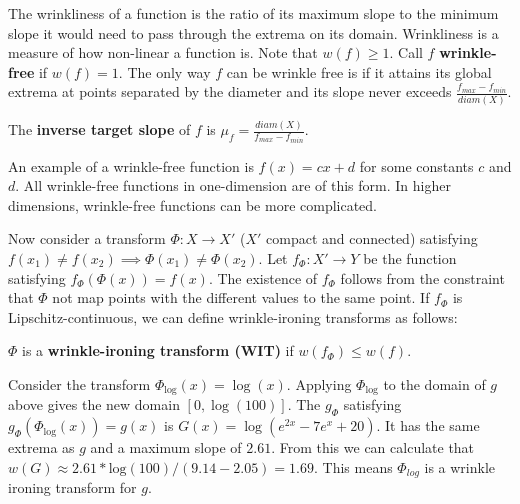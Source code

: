 The wrinkliness of a function is the ratio of its maximum slope to the
minimum slope it would need to pass through the extrema on its domain.
Wrinkliness is a measure of how non-linear a function is.
Note that $w(f) \geq 1$. Call $f$ \textbf{wrinkle-free} if $w(f) = 1$. 
The only way $f$ can be wrinkle free is if it attains its global extrema
at points separated by the diameter and its slope never exceeds
$\frac{f_{max} - f_{min}}{diam(X)}$.

\begin{definition}
The \textbf{inverse target slope} of $f$ is
$\mu_f = \frac{diam(X)}{f_{max} - f_{min}}$.
\end{definition}

An example of a wrinkle-free function is $f(x) = c x + d$ for some
constants $c$ and $d$. All wrinkle-free functions in one-dimension are of
this form. In higher dimensions, wrinkle-free functions can be more
complicated.

Now consider a transform $\Phi: X \to X'$ ($X'$ compact and connected)
satisfying $f(x_1) \neq f(x_2) \implies \Phi(x_1) \neq \Phi(x_2)$.
Let $f_\Phi : X' \to Y$ be the function satisfying $f_\Phi(\Phi(x)) = f(x)$.
The existence of $f_\Phi$ follows from the constraint that $\Phi$ not map
points with the different values to the same point.
If $f_\Phi$ is Lipschitz-continuous, we can define wrinkle-ironing transforms
as follows:

\begin{definition}
$\Phi$ is a \textbf{wrinkle-ironing transform (WIT)} if $w(f_\Phi) \leq w(f)$.
\end{definition}

Consider the transform $\Phi_{\log}(x) = \log(x)$.
Applying $\Phi_{\log}$ to the domain of $g$ above gives the new domain
$[0,\log(100)]$.
The $g_\Phi$ satisfying $g_\Phi(\Phi_{\log}(x)) = g(x)$ is
$G(x) = \log(e^{2x}-7e^x+20)$. It has the same extrema as $g$ and a
maximum slope of $2.61$.
From this we can calculate that
$w(G)\approx2.61*\mathrm{log}(100)/(9.14-2.05)=1.69$.
This means $\Phi_{log}$ is a wrinkle ironing transform for $g$.

